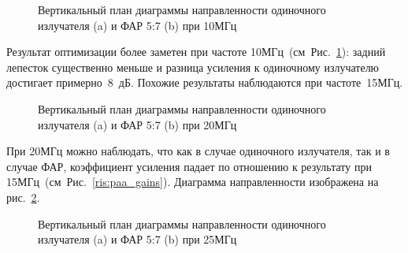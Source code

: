 \begin{figure}
\begin{minipage}[h]{0.49\linewidth}
\end{minipage}
\hfill
\begin{minipage}[h]{0.49\linewidth}
\end{minipage}
\caption{Вертикальный план диаграммы направленности одиночного излучателя (a) и ФАР 5:7 (b) при 10МГц}
\label{ris:10MHz}
\end{figure}

Результат оптимизации более заметен при частоте 10МГц~(см~Рис.~\ref{ris:10MHz}): задний лепесток существенно меньше и разница усиления к одиночному излучателю достигает примерно~8~дБ. Похожие результаты наблюдаются при частоте~15МГц.

\begin{figure}
\begin{minipage}[h]{0.49\linewidth}
\end{minipage}
\hfill
\begin{minipage}[h]{0.49\linewidth}
\end{minipage}
\caption{Вертикальный план диаграммы направленности одиночного излучателя (a) и ФАР 5:7 (b) при 20МГц}
\label{ris:f20mhs}
\end{figure}

При 20МГц можно наблюдать, что как в случае одиночного излучателя, так и в случае ФАР, коэффициент усиления падает по отношению к результату при 15МГц~(см~Рис.~\ref{ris:paa_gains}). Диаграмма направленности изображена на рис.~\ref{ris:f20mhs}.

\begin{figure}
\begin{minipage}[h]{0.49\linewidth}
\end{minipage}
\hfill
\begin{minipage}[h]{0.49\linewidth}
\end{minipage}
\caption{Вертикальный план диаграммы направленности одиночного излучателя (a) и ФАР 5:7 (b) при 25МГц}
\label{ris:f25mhs}
\end{figure}

